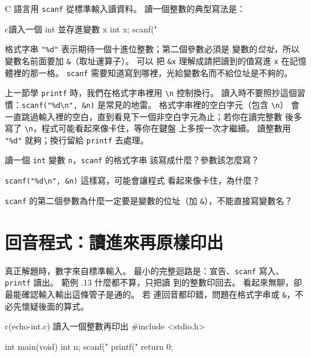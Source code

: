 C 語言用 \texttt{scanf} 從標準輸入讀資料。 讀一個整數的典型寫法是：

\begin{code}{c}{讀入一個 int 並存進變數 x}
int x;
scanf("%
\end{code}

格式字串 \texttt{"\%d"} 表示期待一個十進位整數；第二個參數必須是
變數的\emph{位址}，所以變數名前面要加 \texttt{\&}（取址運算子）。 可以
把 \texttt{\&x} 理解成請把讀到的值寫進 \texttt{x} 在記憶體裡的那一格。
\texttt{scanf} 需要知道寫到哪裡，光給變數名而不給位址是不夠的。

上一節學 \texttt{printf} 時，我們在格式字串裡用 \texttt{\textbackslash n}
控制換行。 讀入時不要照抄這個習慣：\texttt{scanf("\%d\textbackslash n",
\&n)} 是常見的地雷。 格式字串裡的空白字元（包含 \texttt{\textbackslash n}）
會一直跳過輸入裡的空白，直到看見下一個非空白字元為止；若你在讀完整數
後多寫了 \texttt{\textbackslash n}，程式可能看起來像卡住，等你在鍵盤
上多按一次才繼續。 讀整數用 \texttt{"\%d"} 就夠；換行留給 \texttt{printf}
去處理。


\begin{drills}[label=drills:basic-scanf]
\item 讀一個 \texttt{int} 變數 \texttt{n}，\texttt{scanf} 的格式字串
該寫成什麼？參數該怎麼寫？
\item \texttt{scanf("\%d\textbackslash n", \&n)} 這樣寫，可能會讓程式
看起來像卡住，為什麼？
\item \texttt{scanf} 的第二個參數為什麼一定要是變數的位址（加
\texttt{\&}），不能直接寫變數名？
\end{drills}

\section{回音程式：讀進來再原樣印出}
\label{sec:basic-echo}

真正解題時，數字來自標準輸入。 最小的完整迴路是：宣告、\texttt{scanf}
寫入、\texttt{printf} 讀出。 範例 \thechapter.13 什麼都不算，只把讀
到的整數印回去。 看起來無聊，卻最能確認輸入輸出這條管子是通的。 若
連回音都印錯，問題在格式字串或 \texttt{\&}，不必先懷疑後面的算式。

\begin{example}{c}{(echo-int.c) 讀入一個整數再印出}
#include <stdio.h>

int main(void) {
    int n;
    scanf("%
    printf("%
    return 0;
}
\end{example}

